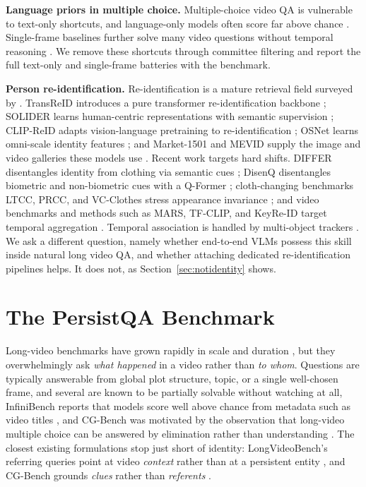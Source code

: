 \documentclass{article}
\newcommand{\bench}{PersistQA}
\begin{document}
\textbf{Language priors in multiple choice.} Multiple-choice video QA is vulnerable to text-only shortcuts, and language-only models often score far above chance \citep{goyal2017vqa,vqacp,annotationartifacts,atp,mmstar}. Single-frame baselines further solve many video questions without temporal reasoning \citep{atp}. We remove these shortcuts through committee filtering and report the full text-only and single-frame batteries with the benchmark.

\textbf{Person re-identification.} Re-identification is a mature retrieval field surveyed by \citet{reidsurvey}. TransReID introduces a pure transformer re-identification backbone \citep{transreid}; SOLIDER learns human-centric representations with semantic supervision \citep{solider}; CLIP-ReID adapts vision-language pretraining to re-identification \citep{clipreid}; OSNet learns omni-scale identity features \citep{osnet}; and Market-1501 and MEVID supply the image and video galleries these models use \citep{market1501,mevid}. Recent work targets hard shifts. DIFFER disentangles identity from clothing via semantic cues \citep{differ}; DisenQ disentangles biometric and non-biometric cues with a Q-Former \citep{disenq}; cloth-changing benchmarks LTCC, PRCC, and VC-Clothes stress appearance invariance \citep{ltcc,prcc,vcclothes}; and video benchmarks and methods such as MARS, TF-CLIP, and KeyRe-ID target temporal aggregation \citep{mars,tfclip,keyreid}. Temporal association is handled by multi-object trackers \citep{sort,bytetrack,botsort,deepocsort,strongsort}. We ask a different question, namely whether end-to-end VLMs possess this skill inside natural long video QA, and whether attaching dedicated re-identification pipelines helps. It does not, as Section~\ref{sec:notidentity} shows.

\section{The \bench{} Benchmark}
\label{sec:bench}


Long-video benchmarks have grown rapidly in scale and duration
\citep{fu2024videomme, zhou2025mlvu, wu2024longvideobench, ataallah2025infinibench},
but they overwhelmingly ask \emph{what happened} in a video rather than \emph{to whom}.
Questions are typically answerable from global plot structure, topic, or a single
well-chosen frame, and several are known to be partially solvable without watching at
all, InfiniBench reports that models score well above chance from metadata such as video
titles \citep{ataallah2025infinibench}, and CG-Bench was motivated by the observation
that long-video multiple choice can be answered by elimination rather than understanding
\citep{chen2025cgbench}. The closest existing formulations stop just short of identity:
LongVideoBench's referring queries point at video \emph{context} rather than at a
persistent entity \citep{wu2024longvideobench}, and CG-Bench grounds \emph{clues} rather
than \emph{referents} \citep{chen2025cgbench}.
\end{document}
